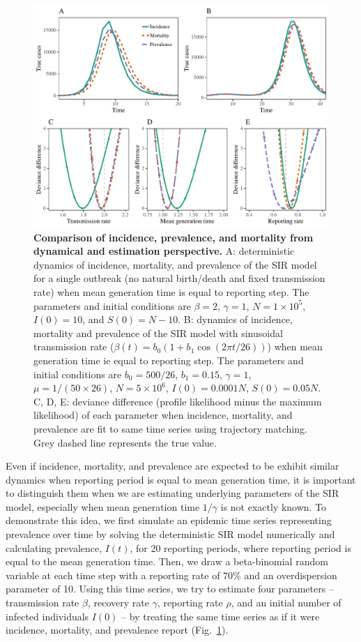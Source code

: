 \documentclass{article}
\newcommand{\fref}[1]{Fig.~\ref{fig:#1}}
\begin{document}
\begin{figure}[!ht]
\includegraphics[width=\textwidth]{../figure/compare_profile_likelihood.pdf}
\caption{
\textbf{Comparison of incidence, prevalence, and mortality from dynamical and estimation perspective.}
A: deterministic dynamics of incidence, mortality, and prevalence of the SIR model for a single outbreak (no natural birth/death and fixed transmission rate) when mean generation time is equal to reporting step.
The parameters and initial conditions are $\beta = 2$, $\gamma = 1$, $N = 1 \times 10^5$, $I(0) = 10$, and $S(0) = N - 10$.
B: dynamics of incidence, mortality and prevalence of the SIR model with sinusoidal transmission rate ($\beta(t) = b_0 (1 + b_1 \cos (2 \pi t/26))$) when mean generation time ie equal to reporting step.
The parameters and initial conditions are $b_0 = 500/26$, $b_1 = 0.15$, $\gamma = 1$, $\mu = 1/(50 \times 26)$, $N = 5 \times 10^6$, $I(0) = 0.0001 N$, $S(0) = 0.05 N$.
C, D, E: deviance difference (profile likelihood minus the maximum likelihood) of each parameter when incidence, mortality, and prevalence are fit to same time series using trajectory matching. 
Grey dashed line represents the true value.
} 
\label{fig:incidence}
\end{figure}

Even if incidence, mortality, and prevalence are expected to be exhibit similar dynamics when reporting period is equal to mean generation time, it is important to distinguish them when we are estimating underlying parameters of the SIR model, especially when mean generation time $1/\gamma$ is not exactly known.
To demonstrate this idea, we first simulate an epidemic time series representing prevalence over time by solving the deterministic SIR model numerically and calculating prevalence, $I(t)$, for 20 reporting periods, where reporting period is equal to the mean generation time. Then, we draw a beta-binomial random variable at each time step with a reporting rate of 70\% and an overdispersion parameter of 10.
Using this time series, we try to estimate four parameters -- transmission rate $\beta$, recovery rate $\gamma$, reporting rate $\rho$, and an initial number of infected individuals $I(0)$ -- by treating the same time series as if it were incidence, mortality, and prevalence report (\fref{incidence}).
\end{document}
